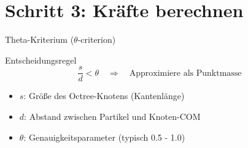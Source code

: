 \documentclass[xcolor=dvipsnames]{beamer}
\begin{document}
\section{Schritt 3: Kräfte berechnen}

\begin{frame}{Theta-Kriterium ($\theta$-criterion)}
\begin{block}{Entscheidungsregel}
\begin{equation}
\frac{s}{d} < \theta \quad \Rightarrow \quad \text{Approximiere als Punktmasse}
\end{equation}
\end{block}

\begin{itemize}
    \item $s$: Größe des Octree-Knotens (Kantenlänge)
    \item $d$: Abstand zwischen Partikel und Knoten-COM
    \item $\theta$: Genauigkeitsparameter (typisch 0.5 - 1.0)
\end{itemize}

\vspace{0.3cm}
\begin{center}
\end{center}
\end{frame}
\end{document}
